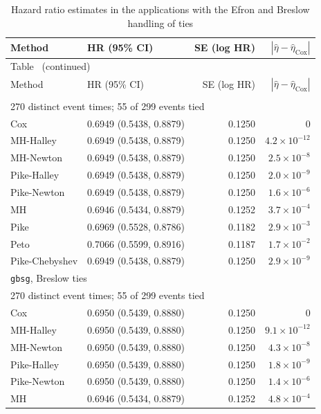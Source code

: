 \begingroup
\footnotesize
\begin{longtable}{llrr}
\caption{Hazard ratio estimates in the applications with the Efron and Breslow handling of ties}\label{tab:application_all}\\
\toprule
Method & HR (95\% CI) & SE (log HR) & $|\hat{\eta} - \hat{\eta}_{\mathrm{Cox}}|$ \\
\midrule
\endfirsthead
\multicolumn{4}{l}{Table~\thetable{} (continued)}\\
\toprule
Method & HR (95\% CI) & SE (log HR) & $|\hat{\eta} - \hat{\eta}_{\mathrm{Cox}}|$ \\
\midrule
\endhead
\bottomrule
\endfoot
\multicolumn{4}{l}{\texttt{gbsg}, Efron ties} \\
\multicolumn{4}{l}{270 distinct event times; 55 of 299 events tied} \\
Cox & 0.6949 (0.5438, 0.8879) & 0.1250 & $0$ \\
MH-Halley & 0.6949 (0.5438, 0.8879) & 0.1250 & $4.2 \times 10^{-12}$ \\
MH-Newton & 0.6949 (0.5438, 0.8879) & 0.1250 & $2.5 \times 10^{-8}$ \\
Pike-Halley & 0.6949 (0.5438, 0.8879) & 0.1250 & $2.0 \times 10^{-9}$ \\
Pike-Newton & 0.6949 (0.5438, 0.8879) & 0.1250 & $1.6 \times 10^{-6}$ \\
MH & 0.6946 (0.5434, 0.8879) & 0.1252 & $3.7 \times 10^{-4}$ \\
Pike & 0.6969 (0.5528, 0.8786) & 0.1182 & $2.9 \times 10^{-3}$ \\
Peto & 0.7066 (0.5599, 0.8916) & 0.1187 & $1.7 \times 10^{-2}$ \\
Pike-Chebyshev & 0.6949 (0.5438, 0.8879) & 0.1250 & $2.9 \times 10^{-9}$ \\
\multicolumn{4}{l}{\texttt{gbsg}, Breslow ties} \\
\multicolumn{4}{l}{270 distinct event times; 55 of 299 events tied} \\
Cox & 0.6950 (0.5439, 0.8880) & 0.1250 & $0$ \\
MH-Halley & 0.6950 (0.5439, 0.8880) & 0.1250 & $9.1 \times 10^{-12}$ \\
MH-Newton & 0.6950 (0.5439, 0.8880) & 0.1250 & $4.3 \times 10^{-8}$ \\
Pike-Halley & 0.6950 (0.5439, 0.8880) & 0.1250 & $1.8 \times 10^{-9}$ \\
Pike-Newton & 0.6950 (0.5439, 0.8880) & 0.1250 & $1.4 \times 10^{-6}$ \\
MH & 0.6946 (0.5434, 0.8879) & 0.1252 & $4.8 \times 10^{-4}$ \\

\end{longtable}
